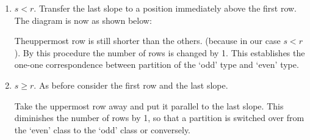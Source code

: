 \begin{enumerate}
\item $s < r$. Transfer the last slope to a position immediately above
  the first row. The diagram is now as shown below:
  \begin{figure}[H]
  \end{figure}
  The\pageoriginale  uppermost row is still shorter than the others. (because in our
  case $s<r$). By this procedure the number of rows is changed by
  1. This establishes the one-one correspondence between partition of
  the `odd' type and `even' type.
\item $s\geq r$. As before consider the first row and the last slope. 
  \begin{figure}[H]
  \end{figure}
  Take the uppermost row away and put it parallel to the last
  slope. This diminishes the number of rows by 1, so that a partition
  is switched over from the `even' class to the `odd' class or
  conversely. 
\end{enumerate}

